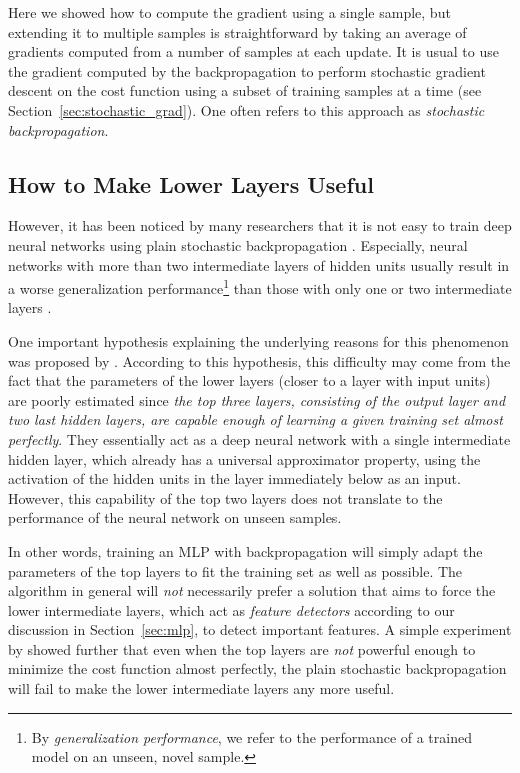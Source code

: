 \documentclass[dissertation,nocontribution,draft*]{aaltoseries}
\begin{document}
Here we showed how to compute the gradient using a single
sample, but extending it to multiple samples is
straightforward by taking an average of
gradients computed from a number of samples at each update. It is usual to
use the gradient computed by the backpropagation to perform
stochastic gradient descent on the cost function using a
subset of training samples at a time (see
Section~\ref{sec:stochastic_grad}). One often refers to this
approach as \textit{stochastic backpropagation}.

\subsection{How to Make Lower Layers Useful}
\label{sec:bp_imp}

However, it has been noticed by many researchers that it is not easy to
train deep neural networks using plain stochastic
backpropagation \citep[see, e.g.,][and references therein]{Bengio2007a}.
Especially, neural networks with more than two intermediate
layers of hidden units usually result in a worse
generalization performance\footnote{By
\textit{generalization performance}, we refer to the
performance of a trained model on an unseen, novel sample.
} than those with only one or two intermediate layers
\citep{Bengio2007nips}.

One important hypothesis explaining the underlying
reasons for this phenomenon was proposed by
\citet{Bengio2007nips}. According to this hypothesis, this
difficulty may come from the fact that the parameters of the
lower layers (closer to a layer with input units) are poorly
estimated since \textit{the top three layers, consisting of
the output layer and two last hidden layers, are capable
enough of learning a given training set almost perfectly}.
They essentially act as a deep neural network with a single
intermediate hidden layer, which already has a universal
approximator property, using the activation of the hidden
units in the layer immediately below as an input. However,
this capability of the top two layers does not translate to
the performance of the neural network on unseen samples.

In other words, training an MLP with backpropagation will
simply adapt the parameters of the top layers to fit the
training set as well as possible. The algorithm in general
will \textit{not} necessarily prefer a solution that aims to
force the lower intermediate layers, which act as
\textit{feature detectors} according to our discussion in
Section~\ref{sec:mlp}, to detect important features.  A
simple experiment by \citet{Bengio2007nips} showed further
that even when the top layers are \textit{not} powerful
enough to minimize the cost function almost perfectly, the
plain stochastic backpropagation will fail to make the lower
intermediate layers any more useful.
\end{document}
